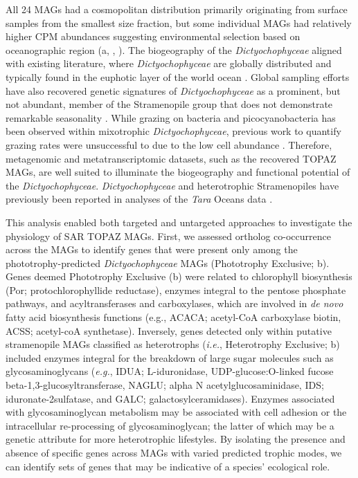 \documentclass[12pt]{article}
\numberwithin{equation}{section}
\begin{document}
All 24 MAGs had a cosmopolitan distribution primarily originating from surface samples from the smallest size fraction, but some individual MAGs had relatively higher CPM abundances suggesting environmental selection based on oceanographic region (a, , ). The biogeography of the \textit{Dictyochophyceae} aligned with existing literature, where \textit{Dictyochophyceae} are globally distributed and typically found in the euphotic layer of the world ocean \citep{vaulot2008fmr, obiol2020mer, massana2011arm}. Global sampling efforts have also recovered genetic signatures of \textit{Dictyochophyceae} as a prominent, but not abundant, member of the Stramenopile group that does not demonstrate remarkable seasonality \citep{giner2019me, obiol2020mer}. While grazing on bacteria and picocyanobacteria has been observed within mixotrophic \textit{Dictyochophyceae}, previous work to quantify grazing rates were unsuccessful to due to the low cell abundance \citep{unrein2014ij}. Therefore, metagenomic and metatranscriptomic datasets, such as the recovered TOPAZ MAGs, are well suited to illuminate the biogeography and functional potential of the \textit{Dictyochophyceae}. \textit{Dictyochophyceae} and heterotrophic Stramenopiles have previously been reported in analyses of the \textit{Tara} Oceans data \citep{Carradec2018global, pierellakarlusich2020arms, vorobev2020gra, sieracki2019sr}.

This analysis enabled both targeted and untargeted approaches to investigate the physiology of SAR TOPAZ MAGs. First, we assessed ortholog co-occurrence across the MAGs to identify genes that were present only among the phototrophy-predicted \textit{Dictyochophyceae} MAGs (Phototrophy Exclusive; b). Genes deemed Phototrophy Exclusive (b) were related to chlorophyll biosynthesis (Por; protochlorophyllide reductase), enzymes integral to the pentose phosphate pathways, and acyltransferases and carboxylases, which are involved in \textit{de novo} fatty acid biosynthesis functions (e.g., ACACA; acetyl-CoA carboxylase biotin, ACSS; acetyl-coA synthetase). Inversely, genes detected only within putative stramenopile MAGs classified as heterotrophs (\textit{i.e.}, Heterotrophy Exclusive;  b) included enzymes integral for the breakdown of large sugar molecules such as glycosaminoglycans (\textit{e.g.}, IDUA; L-iduronidase, UDP-glucose:O-linked fucose beta-1,3-glucosyltransferase, NAGLU; alpha N acetylglucosaminidase, IDS; iduronate-2sulfatase, and GALC; galactosylceramidases). Enzymes associated with glycosaminoglycan metabolism may be associated with cell adhesion or the intracellular re-processing of glycosaminoglycan; the latter of which may be a genetic attribute for more heterotrophic lifestyles. By isolating the presence and absence of specific genes across MAGs with varied predicted trophic modes, we can identify sets of genes that may be indicative of a species' ecological role. 
\end{document}
